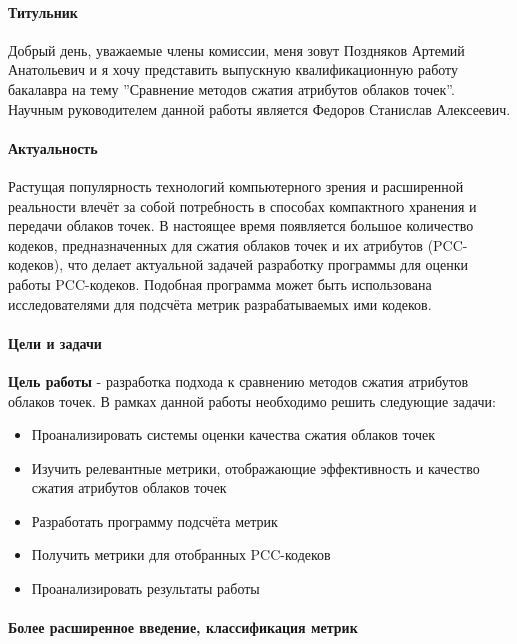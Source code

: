\documentclass[a4paper,12pt]{extreport}
\begin{document}
\paragraph{Титульник}

Добрый день, уважаемые члены комиссии, меня зовут Поздняков Артемий Анатольевич
и я хочу представить выпускную квалификационную работу бакалавра на тему
''Сравнение методов сжатия атрибутов облаков точек''. Научным руководителем
данной работы является Федоров Станислав Алексеевич.

\paragraph{Актуальность}

Растущая популярность технологий компьютерного зрения и расширенной реальности
влечёт за собой потребность в способах компактного хранения и передачи облаков
точек. В настоящее время появляется большое количество кодеков, предназначенных
для сжатия облаков точек и их атрибутов (PCC-кодеков), что делает актуальной
задачей разработку программы для оценки работы PCC-кодеков. Подобная программа
может быть использована исследователями для подсчёта метрик разрабатываемых ими
кодеков.

\paragraph{Цели и задачи}

\textbf{Цель работы} - разработка подхода к сравнению методов сжатия атрибутов
облаков точек. В рамках данной работы необходимо решить следующие задачи:

\begin{itemize}
    \item Проанализировать системы оценки качества сжатия облаков точек
    \item Изучить релевантные метрики, отображающие эффективность и качество
    сжатия атрибутов облаков точек
    \item Разработать программу подсчёта метрик
    \item Получить метрики для отобранных PCC-кодеков
    \item Проанализировать результаты работы
\end{itemize}

\paragraph{Более расширенное введение, классификация метрик}
\end{document}
